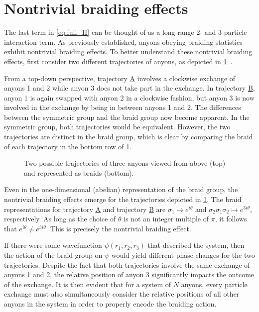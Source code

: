 \section{Nontrivial braiding effects}

The last term in \cref{eq:full_H} can be thought of as a long-range 2- and 3-particle interaction term. As previously established, anyons obeying braiding statistics exhibit nontrivial braiding effects. To better understand these nontrivial braiding effects, first consider two different trajectories of anyons, as depicted in \cref{fig:anyon_trajectores}~\cite{Khare2005}. 

From a top-down perspective, trajectory \hyperref[traj:A]{A} involves a clockwise exchange of anyons 1 and 2 while anyon 3 does not take part in the exchange. In trajectory \hyperref[traj:B]{B}, anyon 1 is again swapped with anyon 2 in a clockwise fashion, but anyon 3 is now involved in the exchange by being in between anyons 1 and 2. The differences between the symmetric group and the braid group now become apparent. In the symmetric group, both trajectories would be equivalent. However, the two trajectories are distinct in the braid group, which is clear by comparing the braid of each trajectory in the bottom row of \cref{fig:anyon_trajectores}.

\begin{figure}[htbp]
    \centering
    
    \caption[Anyon trajectories]{Two possible trajectories of three anyons viewed from above (top) and represented as braids (bottom).}\label{fig:anyon_trajectores}
\end{figure}

Even in the one-dimensional (abelian) representation of the braid group, the nontrivial braiding effects emerge for the trajectories depicted in \cref{fig:anyon_trajectores}. The braid representations for trajectory \hyperref[traj:A]{A} and trajectory \hyperref[traj:B]{B} are $\sigma_1\mapsto e^{i\theta}$ and $\sigma_2\sigma_1\sigma_2\mapsto e^{3i\theta}$, respectively. As long as the choice of $\theta$ is not an integer multiple of $\pi$, it follows that $e^{i\theta}\neq e^{3i\theta}$. This is precisely the nontrivial braiding effect.

If there were some wavefunction $\psi(r_1,r_2,r_3)$ that described the system, then the action of the braid group on $\psi$ would yield different phase changes for the two trajectories.
Despite the fact that both trajectories involve the same exchange of anyons 1 and 2, the relative position of anyon 3 significantly impacts the outcome of the exchange. It is then evident that for a system of $N$ anyons, every particle exchange must also simultaneously consider the relative positions of all other anyons in the system in order to properly encode the braiding action.

